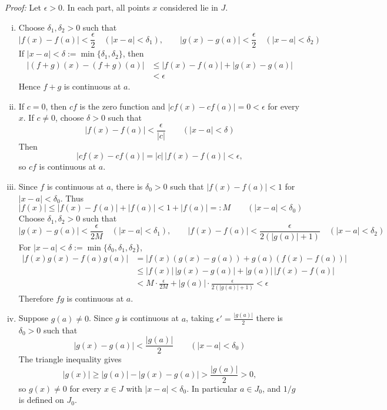 \documentclass[a4paper,11pt,abstracton]{scrartcl}
\theoremstyle{dotlessP}
\theoremstyle{dotlessS}
\theoremstyle{remark}
\theoremstyle{definition}
\begin{document}
\begin{claim_box}
\textit{Proof:}
Let $\epsilon>0$. In each part, all points $x$ considered lie in $J$.

\begin{enumerate}[(i)]
    \item Choose $\delta_1,\delta_2>0$ such that
    \[
        |f(x)-f(a)|<\frac\epsilon2\quad(|x-a|<\delta_1),
        \qquad
        |g(x)-g(a)|<\frac\epsilon2\quad(|x-a|<\delta_2)
    \]
    If $|x-a|<\delta:=\min\{\delta_1,\delta_2\}$, then
    \[
    \begin{aligned}
        |(f+g)(x)-(f+g)(a)|
        &\le|f(x)-f(a)|+|g(x)-g(a)|\\
        &<\epsilon
    \end{aligned}
    \]
    Hence $f+g$ is continuous at $a$.

    \item If $c=0$, then $cf$ is the zero function and $|cf(x)-cf(a)|=0<\epsilon$ for every $x$. If $c\ne0$, choose $\delta>0$ such that
    \[
        |f(x)-f(a)|<\frac\epsilon{|c|}\qquad(|x-a|<\delta)
    \]
    Then
    \[
        |cf(x)-cf(a)|=|c|\,|f(x)-f(a)|<\epsilon,
    \]
    so $cf$ is continuous at $a$.

    \item Since $f$ is continuous at $a$, there is $\delta_0>0$ such that $|f(x)-f(a)|<1$ for $|x-a|<\delta_0$. Thus
    \[
        |f(x)|\le|f(x)-f(a)|+|f(a)|<1+|f(a)|=:M
        \qquad(|x-a|<\delta_0)
    \]
    Choose $\delta_1,\delta_2>0$ such that
    \[
        |g(x)-g(a)|<\frac\epsilon{2M}\quad(|x-a|<\delta_1),
        \qquad
        |f(x)-f(a)|<\frac\epsilon{2(|g(a)|+1)}\quad(|x-a|<\delta_2)
    \]
    For $|x-a|<\delta:=\min\{\delta_0,\delta_1,\delta_2\}$,
    \[
    \begin{aligned}
        |f(x)g(x)-f(a)g(a)|
        &=|f(x)(g(x)-g(a))+g(a)(f(x)-f(a))|\\
        &\le|f(x)|\,|g(x)-g(a)|+|g(a)|\,|f(x)-f(a)|\\
        &<M\cdot\frac\epsilon{2M}+|g(a)|\cdot\frac\epsilon{2(|g(a)|+1)}
        <\epsilon
    \end{aligned}
    \]
    Therefore $fg$ is continuous at $a$.

    \item Suppose $g(a)\ne0$. Since $g$ is continuous at $a$, taking $\epsilon'=\frac{|g(a)|}2$ there is $\delta_0>0$ such that
    \[
        |g(x)-g(a)|<\frac{|g(a)|}2\qquad(|x-a|<\delta_0)
    \]
    The triangle inequality gives
    \[
        |g(x)|\ge|g(a)|-|g(x)-g(a)|>\frac{|g(a)|}2>0,
    \]
    so $g(x)\ne0$ for every $x\in J$ with $|x-a|<\delta_0$. In particular $a\in J_0$, and $1/g$ is defined on $J_0$.


\end{enumerate}
\end{claim_box}
\end{document}
